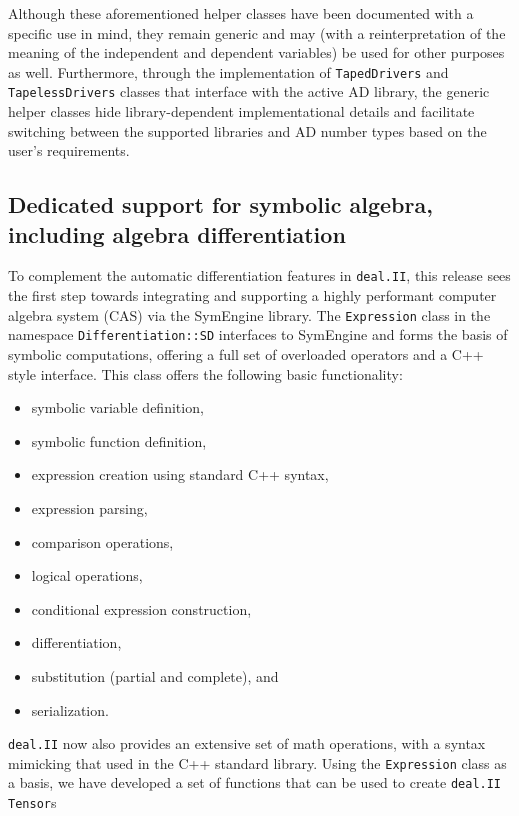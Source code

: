 \documentclass{ansarticle-preprint}
\newcommand{\specialword}[1]{\texttt{#1}}
\newcommand{\dealii}{{\specialword{deal.II}}\xspace}
\begin{document}
Although these aforementioned helper classes have been documented with a specific
use in mind, they remain generic and may (with a reinterpretation of the meaning of
the independent and dependent variables) be used for other purposes as well.
Furthermore, through the implementation of \texttt{TapedDrivers} and
\texttt{TapelessDrivers} classes that interface with the active AD library, the
generic helper classes hide library-dependent implementational details and facilitate
switching between the supported libraries and AD number types based on the
user's requirements.

\subsection{Dedicated support for symbolic algebra, including algebra differentiation}
\label{subsec:sd}
To complement the automatic differentiation features in \dealii{}, this release sees
the first step towards integrating and supporting a highly performant computer algebra
system (CAS) via the SymEngine library.
The \texttt{Expression} class in the namespace \texttt{Differentiation::SD} interfaces
to SymEngine and forms the basis of symbolic computations, offering a full set of
overloaded operators and a C++ style interface. This class offers the following
basic functionality:
\begin{itemize}
\item symbolic variable definition,
\item symbolic function definition,
\item expression creation using standard C++ syntax,
\item expression parsing,
\item comparison operations,
\item logical operations,
\item conditional expression construction,
\item differentiation,
\item substitution (partial and complete), and
\item serialization.
\end{itemize}
\dealii{} now also provides an extensive set of math operations, with a syntax mimicking that used
in the C++ standard library. Using the \texttt{Expression} class as a basis, we
have developed a set of functions that can be used to create \dealii{} \texttt{Tensor}s
\end{document}
